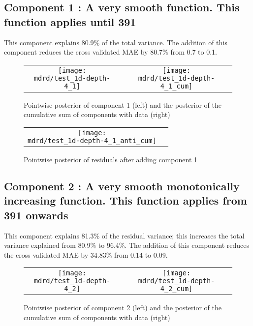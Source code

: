 \documentclass{article} %
\begin{document}
\subsection{Component 1 : A very smooth function. This function applies until  391}



This component explains 80.9\% of the total variance.
The addition of this component reduces the cross validated MAE by 80.7\% from 0.7 to 0.1.


\begin{figure}[H]
\newcommand{\wmgd}{0.5\columnwidth}
\newcommand{\hmgd}{3.0cm}
\newcommand{\mdrd}{test_1d-depth-4}
\newcommand{\mbm}{\hspace{-0.3cm}}
\begin{tabular}{cc}
\mbm \texttt{[image: \\mdrd/test\_1d-depth-4\_1]} & \texttt{[image: \\mdrd/test\_1d-depth-4\_1\_cum]}
\end{tabular}
\caption{Pointwise posterior of component 1 (left) and the posterior of the cumulative sum of components with data (right)}
\label{fig:comp1}
\end{figure}

\begin{figure}[H]
\newcommand{\wmgd}{0.5\columnwidth}
\newcommand{\hmgd}{3.0cm}
\newcommand{\mdrd}{test_1d-depth-4}
\newcommand{\mbm}{\hspace{-0.3cm}}
\begin{tabular}{cc}
\mbm \texttt{[image: \\mdrd/test\_1d-depth-4\_1\_anti\_cum]}
\end{tabular}
\caption{Pointwise posterior of residuals after adding component 1}
\label{fig:comp1}
\end{figure}

\subsection{Component 2 : A very smooth monotonically increasing function. This function applies from  391 onwards}



This component explains 81.3\% of the residual variance; this increases the total variance explained from 80.9\% to 96.4\%.
The addition of this component reduces the cross validated MAE by 34.83\% from 0.14 to 0.09.


\begin{figure}[H]
\newcommand{\wmgd}{0.5\columnwidth}
\newcommand{\hmgd}{3.0cm}
\newcommand{\mdrd}{test_1d-depth-4}
\newcommand{\mbm}{\hspace{-0.3cm}}
\begin{tabular}{cc}
\mbm \texttt{[image: \\mdrd/test\_1d-depth-4\_2]} & \texttt{[image: \\mdrd/test\_1d-depth-4\_2\_cum]}
\end{tabular}
\caption{Pointwise posterior of component 2 (left) and the posterior of the cumulative sum of components with data (right)}
\label{fig:comp2}
\end{figure}
\end{document}
